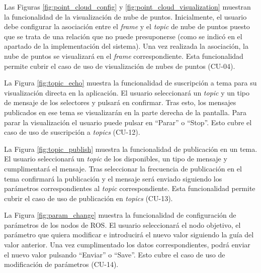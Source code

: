 Las Figuras \ref{fig:point_cloud_config} y \ref{fig:point_cloud_visualization} muestran la funcionalidad de la visualización de nube de puntos.
Inicialmente, el usuario debe configurar la asociación entre el \textit{frame} y el \textit{topic} de nube de puntos puesto que se trata de una relación 
que no puede presuponerse (como se indicó en el apartado de la implementación del sistema). Una vez realizada la asociación, la nube de puntos se visualizará en
el \textit{frame} correspondiente.
Esta funcionalidad permite cubrir el caso de uso de visualización de nubes de puntos (CU-04).

La Figura \ref{fig:topic_echo} muestra la funcionalidad de suscripción a tema para su visualización directa en la aplicación. El usuario
seleccionará un \textit{topic} y un tipo de mensaje de los selectores y pulsará en confirmar. Tras esto, los mensajes publicados en 
ese tema se visualizarán en la parte derecha de la pantalla. Para parar la visualización el usuario puede pulsar en ``Parar'' o ``Stop''.
Esto cubre el caso de uso de suscripción a \textit{topics} (CU-12).

La Figura \ref{fig:topic_publish} muestra la funcionalidad de publicación en un tema. El usuario seleccionará un \textit{topic} de los
disponibles, un tipo de mensaje y cumplimentará el mensaje. Tras seleccionar la frecuencia de publicación en el tema confirmará la publicación y 
el mensaje será enviado siguiendo los parámetros correspondientes al \textit{topic} correspondiente.
Esta funcionalidad permite cubrir el caso de uso de publicación en \textit{topics} (CU-13).

La Figura \ref{fig:param_change} muestra la funcionalidad de configuración de parámetros de los nodos de ROS. El usuario seleccionará el nodo objetivo,
el parámetro que quiera modificar e introducirá el nuevo valor siguiendo la guía del valor anterior. Una vez cumplimentado los datos correspondientes, 
podrá enviar el nuevo valor pulsando ``Enviar'' o ``Save''.
Esto cubre el caso de uso de modificación de parámetros (CU-14).

